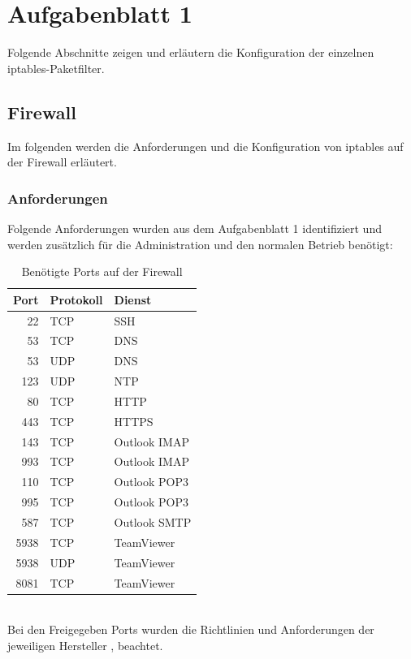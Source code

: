 \documentclass[
    a4paper,
    pagesize,
	pdftex,
    12pt,
]{scrartcl}
\begin{document}
\newpage
\section{Aufgabenblatt 1}

Folgende Abschnitte zeigen und erläutern die Konfiguration der einzelnen iptables-Paketfilter.

\subsection{Firewall}\label{config-firewall-fw}
Im folgenden werden die Anforderungen und die Konfiguration von iptables auf der Firewall erläutert.

\subsubsection{Anforderungen}
Folgende Anforderungen wurden aus dem Aufgabenblatt 1 identifiziert und werden zusätzlich für die Administration und den normalen Betrieb benötigt:
\begin{table}[h!]
	\begin{center}
		\label{tab:table3}
		\begin{tabular}{ r | l | l }
			\textbf{Port} & \textbf{Protokoll} & \textbf{Dienst} \\
			\hline
			22 & TCP & SSH \\
			53 & TCP & DNS \\
			53 & UDP & DNS \\
			123 & UDP & NTP \\
			80 & TCP & HTTP \\
			443 & TCP & HTTPS \\
			143 & TCP & Outlook IMAP \\
			993 & TCP & Outlook IMAP \\
			110 & TCP & Outlook POP3 \\
			995 & TCP & Outlook POP3 \\
			587 & TCP & Outlook SMTP \\
			5938 & TCP & TeamViewer \\
			5938 & UDP & TeamViewer \\
			8081 & TCP & TeamViewer \\
		\end{tabular}
		\caption{Benötigte Ports auf der Firewall}
	\end{center}
\end{table}
\\
Bei den Freigegeben Ports wurden die Richtlinien und Anforderungen der jeweiligen Hersteller \cite{ashaiyengar-2023}, \cite{teamviewer-2024} beachtet. \\ \\
\end{document}
